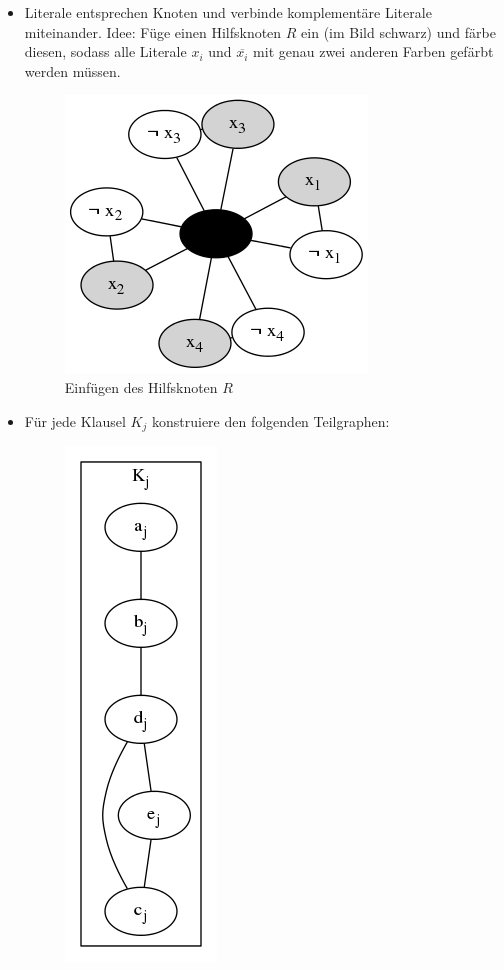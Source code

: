 \documentclass{article} %
\begin{document}
\begin{itemize}
	\item Literale entsprechen Knoten und verbinde komplementäre Literale miteinander.
	Idee: Füge einen Hilfsknoten $R$ ein (im Bild schwarz) und färbe diesen, sodass alle Literale $x_i$ und $\overline{x_i}$ mit genau zwei anderen Farben gefärbt werden müssen.
	\begin{figure}[!htp]
		\centering
		\includegraphics[scale=0.5]{img/3Sat_3Col_central.png}
		\caption{Einfügen des Hilfsknoten $R$}
	\end{figure}
	\newpage
	\item Für jede Klausel $K_j$ konstruiere den folgenden Teilgraphen:
	\begin{figure}[!htp]
		\centering
		\includegraphics[scale=0.5]{img/3Sat_3Col_single_clause.png}

\end{figure}
\end{itemize}
\end{document}

